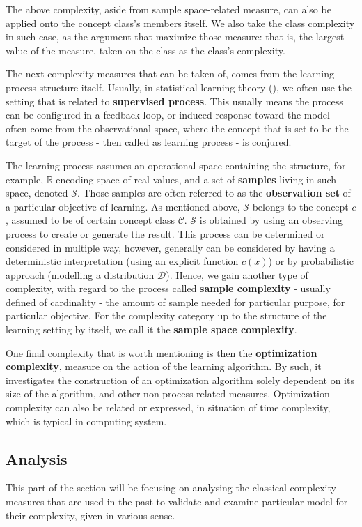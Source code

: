 \documentclass[10pt,oneside,oldfontcommands,dvipsnames,article]{memoir}
\begin{document}
The above complexity, aside from sample space-related measure, can also be applied onto the concept class's members itself. We also take the class complexity in such case, as the argument that maximize those measure: that is, the largest value of the measure, taken on the class as the class's complexity. 

The next complexity measures that can be taken of, comes from the learning process structure itself. Usually, in statistical learning theory (\cite{STL_Hajek_Maxim_2021,10.5555/2371238,10.5555/2621980}), we often use the setting that is related to \textbf{supervised process}. This usually means the process can be configured in a feedback loop, or induced response toward the model - often come from the observational space, where the concept that is set to be the target of the process - then called as learning process - is conjured.

The learning process assumes an operational space containing the structure, for example, $\mathbb{R}$-encoding space of real values, and a set of \textbf{samples} living in such space, denoted $\mathcal{S}$. Those samples are often referred to as the \textbf{observation set} of a particular objective of learning. As mentioned above, $\mathcal{S}$ belongs to the concept $c$, assumed to be of certain concept class $\mathcal{C}$. $\mathcal{S}$ is obtained by using an observing process to create or generate the result. This process can be determined or considered in multiple way, however, generally can be considered by having a deterministic interpretation (using an explicit function $c(x)$) or by probabilistic approach (modelling a distribution $\mathcal{D}$). Hence, we gain another type of complexity, with regard to the process called \textbf{sample complexity} - usually defined of cardinality - the amount of sample needed for particular purpose, for particular objective. For the complexity category up to the structure of the learning setting by itself, we call it the \textbf{sample space complexity}. 

One final complexity that is worth mentioning is then the \textbf{optimization complexity}, measure on the action of the learning algorithm. By such, it investigates the construction of an optimization algorithm solely dependent on its size of the algorithm, and other non-process related measures. Optimization complexity can also be related or expressed, in situation of time complexity, which is typical in computing system. 

\subsection{Analysis}
This part of the section will be focusing on analysing the classical complexity measures that are used in the past to validate and examine particular model for their complexity, given in various sense. 
\end{document}
